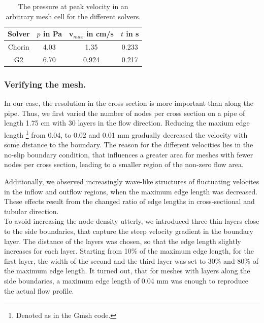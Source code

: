 \begin{table}\begin{center}
    \begin{tabular}{ | c | c | c | c |}
    \hline
    Solver & $p$ in Pa & $\mathbf{v}_{max}$ in cm/s  & $t$ in s \\ \hline\hline
	Chorin & 4.03 & 1.35 & 0.233 	\\ \hline
	G2	& 6.70 & 0.924 & 0.217	\\ \hline
    \hline
    \end{tabular}
	\label{tab:solvers}
	\caption{The pressure at peak velocity in an arbitrary mesh cell for the different solvers.}
\end{center}\end{table}


\subsubsection{Verifying the mesh.}
In our case, the resolution in the cross section is more important than along the pipe. Thus, we first varied the number of nodes per cross section on a pipe of length 1.75 cm with 30 layers in the flow direction. Reducing the maxium edge length \footnote{Denoted as  in the Gmsh code.} from 0.04, to 0.02 and 0.01 mm gradually decreased the velocity with some distance to the boundary. The reason for the different velocities lies in the no-slip boundary condition, that influences a greater area for meshes with fewer nodes per cross section, leading to a smaller region of the non-zero flow area. 

Additionally, we observed increasingly wave-like structures of fluctuating velocites in the inflow and outflow regions, when the maximum edge length was decreased. These effects result from the changed ratio of edge lengths in cross-sectional and tubular direction.\\

To avoid increasing the node density utterly, we introduced three thin layers close to the side boundaries, that capture the steep velocity gradient in the boundary layer. The distance of the layers was chosen, so that the edge length slightly increases for each layer. Starting from 10\% of the maximum edge length, for the first layer, the width of the second and the third layer was set to 30\% and 80\% of the maximum edge length. It turned out, that for meshes with layers along the side boundaries, a maximum edge length of 0.04 mm was enough to reproduce the actual flow profile. 

